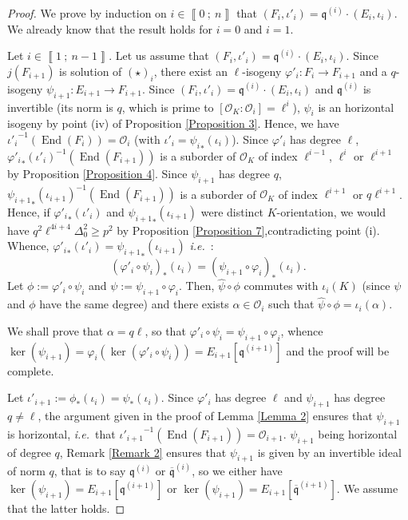 \documentclass[a4paper,10pt,notitlepage]{report}
\theoremstyle{definition}
\theoremstyle{plain}
\theoremstyle{definition}
\newcommand{\ie}{\emph{i.e.}\ }
\newcommand{\mO}{\mathcal{O}}
\renewcommand{\i}[2]{\left\llbracket #1~;~#2\right\rrbracket}
\renewcommand{\(}{\left(}
\renewcommand{\)}{\right)}
\newcommand{\mf}[1]{\mathfrak{#1}}
\newcommand{\mfq}{\mathfrak{q}}
\DeclareMathOperator{\End}{End}
\begin{document}
\begin{proof}
We prove by induction on $i\in\i{0}{n}$ that $(F_i,\iota'_i)=\mf{q}^{(i)}\cdot(E_{i},\iota_i)$. We already know that the result holds for $i=0$ and $i=1$. 

Let $i\in\i{1}{n-1}$.  Let us assume that $(F_i,\iota'_i)=\mf{q}^{(i)}\cdot(E_{i},\iota_i)$. Since $j(F_{i+1})$ is solution of $(\star)_i$,  there exist an $\ell$-isogeny $\varphi'_i: F_i\longrightarrow F_{i+1}$ and a $q$-isogeny $\psi_{i+1}: E_{i+1}\longrightarrow F_{i+1}$. Since $(F_i,\iota'_i)=\mf{q}^{(i)}\cdot(E_{i},\iota_i)$ and $\mfq^{(i)}$ is invertible (its norm is $q$, which is prime to $[\mO_K:\mO_i]=\ell^i$), $\psi_i$ is an horizontal isogeny by point (iv) of Proposition \ref{Proposition 3}. Hence, we have ${\iota'_i}^{-1}(\End(F_i))=\mO_i$ (with $\iota'_i={\psi_{i}}_*(\iota_i)$). Since $\varphi'_i$ has degree $\ell$,  ${\varphi'_i}_*(\iota'_i)^{-1}(\End(F_{i+1}))$ is a suborder of $\mO_K$ of index $\ell^{i-1}$, $\ell^i$ or $\ell^{i+1}$ by Proposition \ref{Proposition 4}. Since $\psi_{i+1}$ has degree $q$, ${\psi_{i+1}}_*(\iota_{i+1})^{-1}(\End(F_{i+1}))$ is a suborder of $\mO_K$ of index $\ell^{i+1}$ or $q\ell^{i+1}$. Hence, if ${\varphi'_i}_*(\iota'_i)$ and ${\psi_{i+1}}_*(\iota_{i+1})$ were distinct $K$-orientation, we would have $q^2\ell^{4i+4}\Delta_0^2\geq p^2$ by Proposition \ref{Proposition 7},contradicting point (i). Whence, ${\varphi'_i}_*(\iota'_i)={\psi_{i+1}}_*(\iota_{i+1})$ \ie :
\[(\varphi'_i\circ\psi_i)_*(\iota_i)=(\psi_{i+1}\circ\varphi_i)_*(\iota_i).\]
Let $\phi:=\varphi'_i\circ\psi_i$ and $\psi:=\psi_{i+1}\circ\varphi_i$. Then, $\widehat{\psi}\circ\phi$ commutes with $\iota_i(K)$ (since $\psi$ and $\phi$ have the same degree) and there exists $\alpha\in\mO_i$ such that $\widehat{\psi}\circ\phi=\iota_i(\alpha)$. 

We shall prove that $\alpha=q\ell$, so that $\varphi'_i\circ\psi_i=\psi_{i+1}\circ\varphi_i$, whence $\ker(\psi_{i+1})=\varphi_i(\ker(\varphi'_i\circ\psi_i))=E_{i+1}[\mfq^{(i+1)}]$ and the proof will be complete.

Let $\iota'_{i+1}:=\phi_*(\iota_i)=\psi_*(\iota_i)$.  Since $\varphi'_i$ has degree $\ell$ and $\psi_{i+1}$ has degree $q\neq \ell$, the argument given in the proof of Lemma \ref{Lemma 2} ensures that $\psi_{i+1}$ is horizontal, \ie that ${\iota'_{i+1}}^{-1}(\End(F_{i+1}))=\mO_{i+1}$.  $\psi_{i+1}$ being horizontal of degree $q$, Remark \ref{Remark 2} ensures that $\psi_{i+1}$ is given by an invertible ideal of norm $q$, that is to say $\mfq^{(i)}$ or $\overline{\mfq}^{(i)}$, so we either have $\ker(\psi_{i+1})=E_{i+1}[\mfq^{(i+1)}]$ or $\ker(\psi_{i+1})=E_{i+1}[\overline{\mfq}^{(i+1)}]$.  We assume that the latter holds.


\end{proof}
\end{document}
